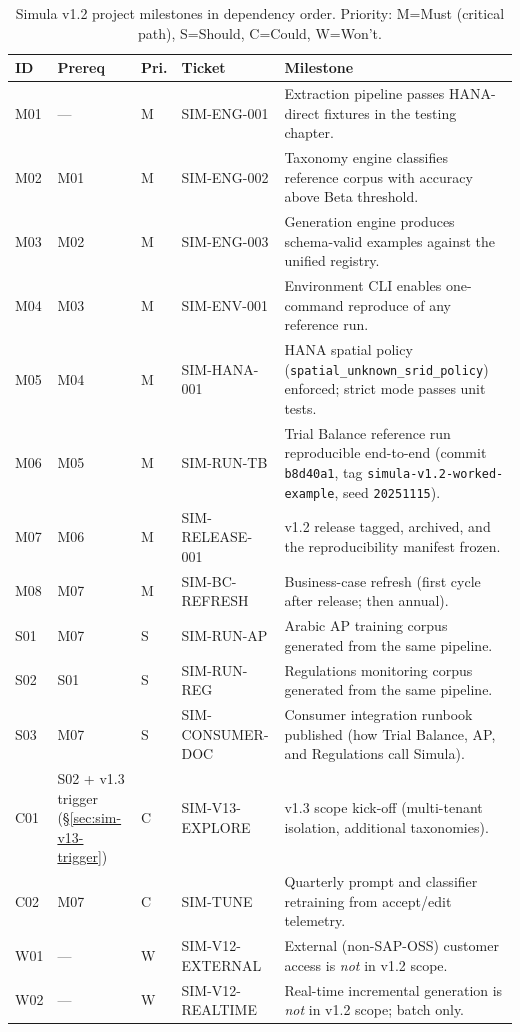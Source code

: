 \begin{table}[htbp]
\centering
\caption{Simula v1.2 project milestones in dependency order.
Priority: M=Must (critical path), S=Should, C=Could, W=Won't.}
\label{tab:sim-milestones}
\footnotesize
\begin{tabularx}{\linewidth}{@{}l l l l X@{}}
\toprule
\textbf{ID} & \textbf{Prereq} & \textbf{Pri.} & \textbf{Ticket} & \textbf{Milestone} \\ \midrule
M01 & ---      & M & SIM-ENG-001       & Extraction pipeline passes HANA-direct fixtures in the testing chapter. \\
M02 & M01      & M & SIM-ENG-002       & Taxonomy engine classifies reference corpus with accuracy above Beta threshold. \\
M03 & M02      & M & SIM-ENG-003       & Generation engine produces schema-valid examples against the unified registry. \\
M04 & M03      & M & SIM-ENV-001       & Environment CLI enables one-command reproduce of any reference run. \\
M05 & M04      & M & SIM-HANA-001      & HANA spatial policy (\texttt{spatial\_unknown\_srid\_policy}) enforced; strict mode passes unit tests. \\
M06 & M05      & M & SIM-RUN-TB        & Trial Balance reference run reproducible end-to-end (commit \texttt{b8d40a1}, tag \texttt{simula-v1.2-worked-example}, seed \texttt{20251115}). \\
M07 & M06      & M & SIM-RELEASE-001   & v1.2 release tagged, archived, and the reproducibility manifest frozen. \\
M08 & M07      & M & SIM-BC-REFRESH    & Business-case refresh (first cycle after release; then annual). \\
S01 & M07      & S & SIM-RUN-AP        & Arabic AP training corpus generated from the same pipeline. \\
S02 & S01      & S & SIM-RUN-REG       & Regulations monitoring corpus generated from the same pipeline. \\
S03 & M07      & S & SIM-CONSUMER-DOC  & Consumer integration runbook published (how Trial Balance, AP, and Regulations call Simula). \\
C01 & S02 + v1.3 trigger (\S\ref{sec:sim-v13-trigger}) & C & SIM-V13-EXPLORE & v1.3 scope kick-off (multi-tenant isolation, additional taxonomies). \\
C02 & M07      & C & SIM-TUNE          & Quarterly prompt and classifier retraining from accept/edit telemetry. \\
W01 & ---      & W & SIM-V12-EXTERNAL  & External (non-SAP-OSS) customer access is \emph{not} in v1.2 scope. \\
W02 & ---      & W & SIM-V12-REALTIME  & Real-time incremental generation is \emph{not} in v1.2 scope; batch only. \\
\bottomrule
\end{tabularx}
\end{table}

